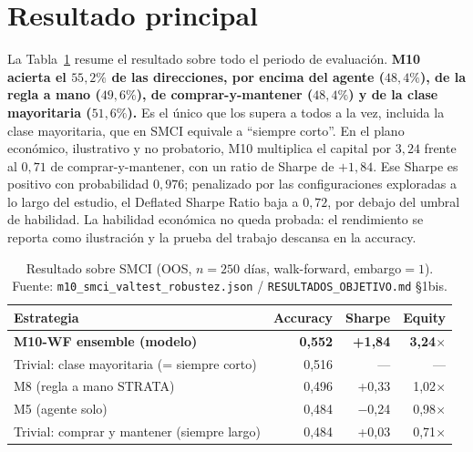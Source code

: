 \section{Resultado principal}
\label{sec:resultado}

La Tabla~\ref{tab:smci-resultado} resume el resultado sobre todo el periodo de evaluación. \textbf{M10 acierta el $55{,}2\%$ de las direcciones, por encima del agente ($48{,}4\%$), de la regla a mano ($49{,}6\%$), de comprar-y-mantener ($48{,}4\%$) y de la clase mayoritaria ($51{,}6\%$).} Es el único que los supera a todos a la vez, incluida la clase mayoritaria, que en SMCI equivale a ``siempre corto''. En el plano económico, ilustrativo y no probatorio, M10 multiplica el capital por $3{,}24$ frente al $0{,}71$ de comprar-y-mantener, con un ratio de Sharpe de $+1{,}84$. Ese Sharpe es positivo con probabilidad $0{,}976$; penalizado por las configuraciones exploradas a lo largo del estudio, el Deflated Sharpe Ratio baja a $0{,}72$, por debajo del umbral de habilidad. La habilidad económica no queda probada: el rendimiento se reporta como ilustración y la prueba del trabajo descansa en la accuracy.

\begin{table}[htbp]
\centering
\caption{Resultado sobre SMCI (OOS, $n=250$ días, walk-forward, embargo$=1$). Fuente: \texttt{m10\_smci\_valtest\_robustez.json} / \texttt{RESULTADOS\_OBJETIVO.md} §1bis.}
\label{tab:smci-resultado}
\begin{tabular}{lrrr}
\hline
Estrategia & Accuracy & Sharpe & Equity \\
\hline
\textbf{M10-WF ensemble (modelo)} & \textbf{0,552} & \textbf{+1,84} & \textbf{3,24$\times$} \\
Trivial: clase mayoritaria (= siempre corto) & 0,516 & --- & --- \\
M8 (regla a mano STRATA) & 0,496 & +0,33 & 1,02$\times$ \\
M5 (agente solo) & 0,484 & $-$0,24 & 0,98$\times$ \\
Trivial: comprar y mantener (siempre largo) & 0,484 & +0,03 & 0,71$\times$ \\
\hline
\end{tabular}
\end{table}


